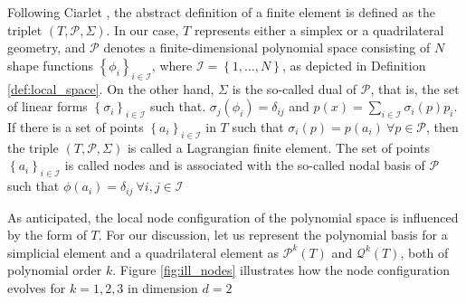\documentclass[11pt]{article}
\theoremstyle{remark}
\numberwithin{equation}{section}
\begin{document}
Following Ciarlet \cite[pp.93]{ciarlet1991basic}, the abstract definition of a finite element is defined as the triplet $( T, \mathcal{P}, \Sigma ) $.
In our case, $T$ represents either a simplex or a quadrilateral geometry, and $\mathcal{P}$ denotes a finite-dimensional polynomial space consisting of $N$ shape functions $\left\{ \phi_{i} \right\}_{i\in \mathcal{I} } $, where $\mathcal{I} = \left\{
1, \ldots, N \right\} $, as depicted in Definition \ref{def:local_space}.
On the other hand, $\Sigma $ is the so-called dual of $\mathcal{P}$, that is, the set of linear forms $\left\{ \sigma _{i} \right\}_{i \in \mathcal{I} } $ such that. $ \sigma_{j} ( \phi_{i} ) = \delta _{ij}$ and $p( x) = \sum_{i\in \mathcal{I} }^{} \sigma_{i} ( p) p_{i} $.
If there is a set of points $\left\{ a_{i} \right\}_{i \in \mathcal{I} } $  in $T$ such that
$\sigma_{i}( p) = p( a_{i}) \  \forall p \in \mathcal{P}$,  then the triple $( T, \mathcal{P}, \Sigma  ) $ is called a Lagrangian finite element. The set of points $\left\{ a_{i} \right\}_{i \in \mathcal{I} }  $ is called nodes and is associated with the
so-called nodal basis of $\mathcal{P} $ such that  $\phi ( a_{i}) = \delta _{ij} \ \forall i,j  \in \mathcal{I} $

As anticipated, the local node configuration of the polynomial space is influenced by the form of $T$. For our discussion, let us represent the polynomial basis for a simplicial element and a quadrilateral
element as $\mathcal{P} ^{k}(T )$ and $\mathcal{Q} ^{k}( T)$, both of polynomial order $k$. Figure \ref{fig:ill_nodes} illustrates how the node configuration evolves for  $k=1,2,3$ in dimension $d=2$
\end{document}
